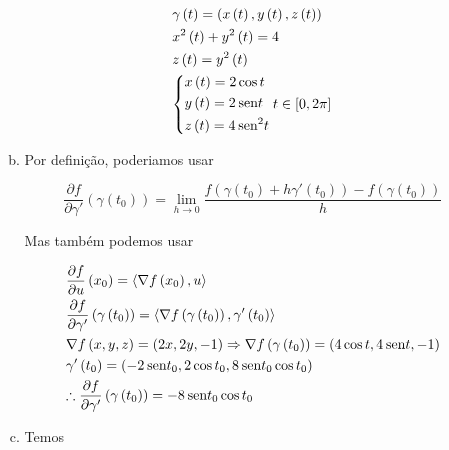 \documentclass{book}
\begin{document}
\begin{enumerate}
\begin{sol}
\begin{enumerate}[(a)]
\[
\begin{gathered}
  \gamma \left( t \right) = \left( {x\left( t \right),y\left( t \right),z\left( t \right)} \right) \hfill \\
  x^2 \left( t \right) + y^2 \left( t \right) = 4 \hfill \\
  z\left( t \right) = y^2 \left( t \right) \hfill \\
  \left\{ \begin{gathered}
  x\left( t \right) = 2\cos t \hfill \\
  y\left( t \right) = 2\sin t \hfill \\
  z\left( t \right) = 4\sin ^2 t \hfill \\
\end{gathered}  \right.t \in \left[ {0,2\pi } \right] \hfill \\
\end{gathered}
\]

  \item Por defini\c{c}\~ao, poderiamos usar

\[
\frac{{\partial f}}
{{\partial \gamma '}}\left( {\gamma \left( {t_0 } \right)} \right) = \mathop {\lim }\limits_{h \to 0} \frac{{f\left( {\gamma \left( {t_0 } \right) + h\gamma '\left( {t_0 } \right)} \right) - f\left( {\gamma \left( {t_0 } \right)} \right)}}
{h}
\]

Mas tamb\'em podemos usar

\[
\begin{gathered}
  \frac{{\partial f}}
{{\partial u}}\left( {x_0 } \right) = \left\langle {\nabla f\left( {x_0 } \right),u} \right\rangle  \hfill \\
  \frac{{\partial f}}
{{\partial \gamma '}}\left( {\gamma \left( {t_0 } \right)} \right) = \left\langle {\nabla f\left( {\gamma \left( {t_0 } \right)} \right),\gamma '\left( {t_0 } \right)} \right\rangle  \hfill \\
  \nabla f\left( {x,y,z} \right) = \left( {2x,2y, - 1} \right) \Rightarrow \nabla f\left( {\gamma \left( {t_0 } \right)} \right) = \left( {4\cos t,4\sin t, - 1} \right) \hfill \\
  \gamma '\left( {t_0 } \right) = \left( { - 2\sin t_0 ,2\cos t_0 ,8\sin t_0 \cos t_0 } \right) \hfill \\
  \therefore \frac{{\partial f}}
{{\partial \gamma '}}\left( {\gamma \left( {t_0 } \right)} \right) =  - 8\sin t_0 \cos t_0  \hfill \\
\end{gathered}
\]


  \item Temos


\end{enumerate}
\end{sol}
\end{enumerate}
\end{document}
